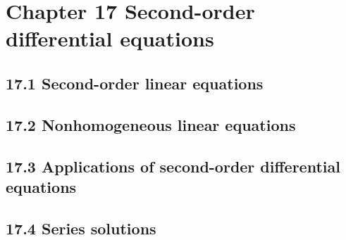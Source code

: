 \documentclass{article}
\begin{document}
\section{Chapter 17 Second-order differential equations}
\subsection{17.1 Second-order linear equations}
\subsection{17.2 Nonhomogeneous linear equations}
\subsection{17.3 Applications of second-order differential equations}
\subsection{17.4 Series solutions}
\end{document}
